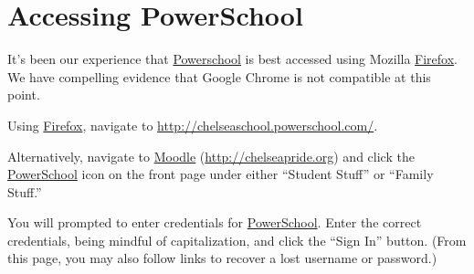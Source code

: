 \documentclass[letterpaper,10pt,english]{sphinxmanual}
\begin{document}
\section{Accessing PowerSchool}
\label{powerschool:accessing-powerschool}
It's been our experience that \href{http://chelseaschool.powerschool.com/}{Powerschool} is best accessed using Mozilla \href{http://www.mozilla.org/en-US/firefox/new/}{Firefox}. We have compelling evidence that Google Chrome is not compatible at this point.

Using \href{http://www.mozilla.org/en-US/firefox/new/}{Firefox}, navigate to \href{http://chelseaschool.powerschool.com/}{http://chelseaschool.powerschool.com/}.

Alternatively, navigate to \href{http://chelseapride.org}{Moodle} (\href{http://chelseapride.org}{http://chelseapride.org}) and click the \href{http://chelseaschool.powerschool.com/}{PowerSchool} icon on the front page under either ``Student Stuff'' or ``Family Stuff.''

You will prompted to enter credentials for \href{http://chelseaschool.powerschool.com/}{PowerSchool}. Enter the correct credentials, being mindful of capitalization, and click the ``Sign In'' button. (From this page, you may also follow links to recover a lost username or password.)

{\hfill{}\hfill}
\end{document}
